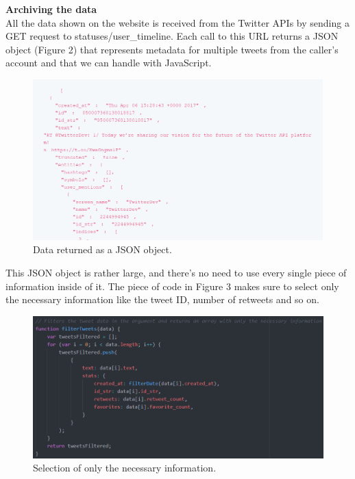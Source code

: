 \documentclass[12pt]{article} %
\begin{document}
\noindent\textbf{Archiving the data}
\\[0.3cm]
All the data shown on the website is received from the Twitter APIs by sending a GET request to statuses/user\_timeline.
Each call to this URL returns a JSON object (Figure 2) that represents metadata for multiple tweets from the caller's account and that we can handle with JavaScript.

\begin{figure}[H] %
\includegraphics[width=1\linewidth]{images/getStatusesTimeline}
\caption{Data returned as a JSON object.}
\label{getStatusesTimeline}
\end{figure}

\noindent This JSON object is rather large, and there's no need to use every single piece of information inside of it.
The piece of code in Figure 3 makes sure to select only the necessary information like the tweet ID, number of retweets and so on.

\begin{figure}[H] %
\includegraphics[width=1\linewidth]{images/informationSelection}
\caption{Selection of only the necessary information.}
\label{informationSelection}
\end{figure}
\end{document}
